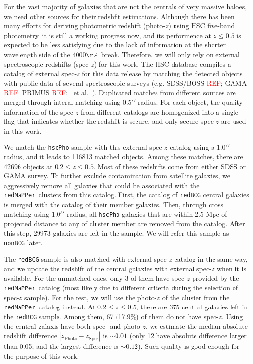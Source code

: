 \documentclass[preprint]{aastex}
\def\arcsec{{\prime\prime}}
\def\etal{{\ et al.~}}
\def\redm{\texttt{redMaPPer}~}
\newcommand{\addref}{{\textcolor{red}{REF}}}
\begin{document}
\begin{CJK*}{UTF8}{gbsn}
    For the vast majority of galaxies that are not the centrals of very massive haloes, we
    need other sources for their redshfit estimations. 
    Although there has been many efforts for deriving photometric redshift (photo-$z$)
    using HSC five-band photometry, it is still a working progress now, and its
    performence at $z \leq 0.5$ is expected to be less satisfying due to the lack of
    information at the shorter wavelength side of the 4000$\AA$ break.  
    Therefore, we will only rely on external spectroscopic redshifts (spec-$z$) for this
    work.  
    The HSC database compiles a catalog of external spec-$z$ for this data release by
    matching the detected objects with public data of several spectroscopic surveys (e.g.
    SDSS/BOSS \addref; GAMA \addref; PRIMUS \addref; \etal). 
    Duplicated matches from different sources are merged through interal matching using
    $0.5\arcsec$ radius. 
    For each object, the quality information of the spec-$z$ from different catalogs are 
    homogenized into a single flag that indicates whether the redshfit is secure, and 
    only secure spec-$z$ are used in this work. 
    
    We match the \texttt{hscPho} sample with this external spec-$z$ catalog using a 
    $1.0 \arcsec$ radius, and it leads to 116813 matched objects.  
    Among these matches, there are 42696 objects at $0.2 \leq z \leq 0.5$. 
    Most of these redshifts come from either SDSS or GAMA survey.
    To further exclude contamination from satellite galaxies, we aggressively remove 
    all galaxies that could be associated with the \redm clusters from this catalog.  
    First, the catalog of \texttt{redBCG} central galaxies is merged with the catalog  
    of their member galaxies. 
    Then, through cross matching using $1.0 \arcsec$ radius, all \texttt{hscPho} galaxies 
    that are within 2.5 Mpc of projected distance to any of cluster member are removed 
    from the catalog.  
    After this step, 29973 galaxies are left in the sample. 
    We will refer this sample as \texttt{nonBCG} later.

    The \texttt{redBCG} sample is also matched with external spec-$z$ catalog in the same
    way, and we update the redshift of the central galaxies with external spec-$z$ when 
    it is available.  
    For the unmatched ones, only 3 of them have spec-$z$ provided by the \redm catalog 
    (most likely due to different criteria during the selection of spec-$z$ sample).
    For the rest, we will use the photo-$z$ of the cluster from the \redm catalog instead.
    At $0.2 \leq z \leq 0.5$, there are 375 central galaxies left in the \texttt{redBCG} 
    sample. 
    Among them, 67 (17.9\%) of them do not have spec-$z$.
    Using the central galaxis have both spec- and photo-$z$, we estimate the median 
    absolute redshift difference $|z_{\mathrm{Photo}} - z_{\mathrm{Spec}}|$ is 
    $\sim 0.01$ (only 12 have absolute difference larger than 0.05; and the largest 
    difference is $\sim 0.12$).
    Such quality is good enough for the purpose of this work. 


\end{CJK*}
\end{document}

